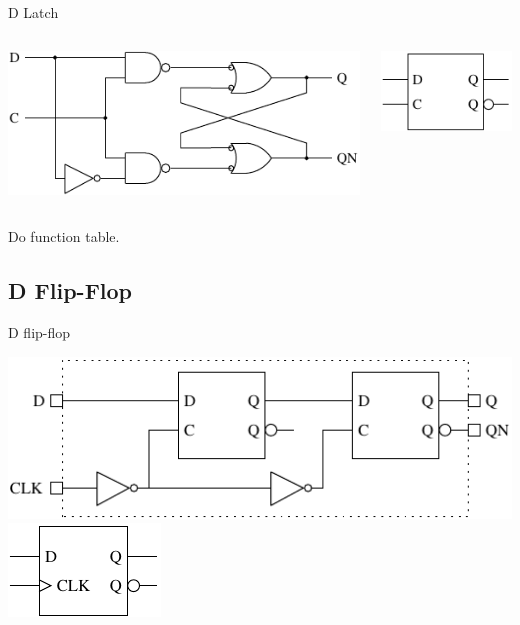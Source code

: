 \begin{frame}{D Latch}
  \begin{columns}
    \begin{column}{6cm}
      \begin{center}
        \includegraphics{DLatchCircuit}
      \end{center}
    \end{column}
    \begin{column}{6cm}
      \begin{center}
        \includegraphics{DLatchSchematic}
      \end{center}
    \end{column}
  \end{columns}
\end{frame}

Do function table.

\subsection{D Flip-Flop}

\begin{frame}{D flip-flop}
  \begin{center}
    \includegraphics{DFlipFlopLogic} \\
    \includegraphics{DFlipFlopSchematic}
  \end{center}
\end{frame}

